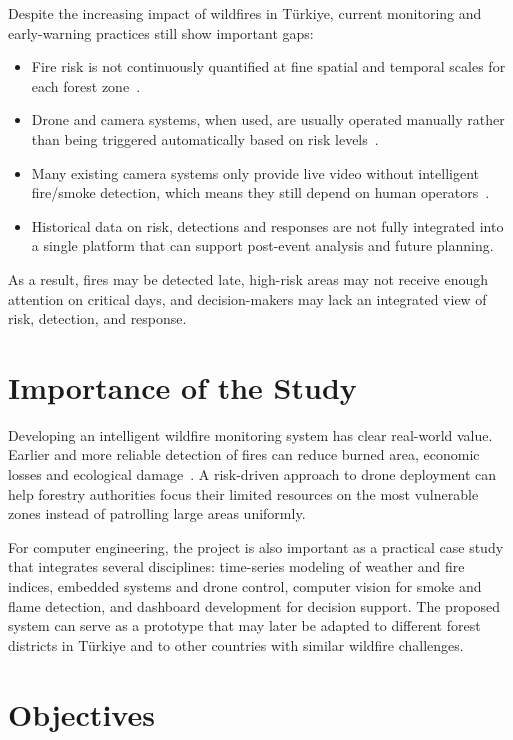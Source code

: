 \documentclass[11pt,a4paper]{report}
\begin{document}
Despite the increasing impact of wildfires in Türkiye, current monitoring and early-warning practices still show important gaps:

\begin{itemize}
  \item Fire risk is not continuously quantified at fine spatial and temporal scales for each forest zone~\cite{colak2020}.
  \item Drone and camera systems, when used, are usually operated manually rather than being triggered automatically based on risk levels~\cite{rjoub2023}.
  \item Many existing camera systems only provide live video without intelligent fire/smoke detection, which means they still depend on human operators~\cite{mohapatra2022}.
  \item Historical data on risk, detections and responses are not fully integrated into a single platform that can support post-event analysis and future planning.
\end{itemize}

As a result, fires may be detected late, high-risk areas may not receive enough attention on critical days, and decision-makers may lack an integrated view of risk, detection, and response.

\section{Importance of the Study}

Developing an intelligent wildfire monitoring system has clear real-world value. Earlier and more reliable detection of fires can reduce burned area, economic losses and ecological damage~\cite{mohapatra2022}. A risk-driven approach to drone deployment can help forestry authorities focus their limited resources on the most vulnerable zones instead of patrolling large areas uniformly.

For computer engineering, the project is also important as a practical case study that integrates several disciplines: time-series modeling of weather and fire indices, embedded systems and drone control, computer vision for smoke and flame detection, and dashboard development for decision support. The proposed system can serve as a prototype that may later be adapted to different forest districts in Türkiye and to other countries with similar wildfire challenges.

\section{Objectives}
\end{document}
